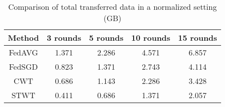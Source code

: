 \begin{table}[h!]
\centering
\label{Transferred data}
\setlength{\tabcolsep}{5.5pt}
\renewcommand\arraystretch{1.12}
\caption{ \small Comparison of total transferred data in a normalized setting (GB)}
\begin{tabular}{| *{5}{c|} }
\hline
Method & 3 rounds & 5 rounds & 10 rounds & 15 rounds 
\\   \hline  
FedAVG
 & 1.371 &2.286 & 4.571 & 6.857\\

 \hline
 FedSGD
 &  0.823 & 1.371 &2.743 & 4.114\\
\hline  
CWT
 &  0.686 & 1.143 &2.286 & 3.428\\



\hline  
STWT &
  0.411 & 0.686 &1.371 & 2.057\\

 

 \hline
\end{tabular}
\label{transferredData} 
\end{table}







\label{sec:results}


